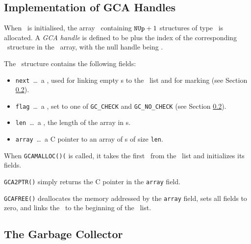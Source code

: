 \subsection{Implementation of GCA Handles}

When \saclib\ is initialised, the array \GCASPACE\ containing ${\tt NUp}+1$
structures of type \GCArray\ is allocated. A {\em GCA handle} is defined to be
\BETAp plus the index of the corresponding \GCArray\ structure in the
\GCASPACE\ array, with the null handle being \NIL.

The \GCArray\ structure contains the following fields:
\begin{itemize}
\item {\tt next}\ \ldots\
  a \Word, used for linking empty \GCArray s to the \GCAAVAIL\ list and for
  marking (see Section \ref{cNIWsGCssGC}).
\item {\tt flag}\ \ldots\
  a \Word, set to one of {\tt GC\_CHECK} and {\tt GC\_NO\_CHECK} (see Section
  \ref{cNIWsGCssGC}).
\item {\tt len}\ \ldots\
  a \Word, the length of the array in \Word s.
\item {\tt array}\ \ldots\
  a C pointer to an array of \Word s of size {\tt len}.
\end{itemize}

When {\tt GCAMALLOC()(} is called, it takes the first \GCArray\ from the
\GCAAVAIL\ list and initializes its fields.

{\tt GCA2PTR()} simply returns the C pointer in the {\tt array} field.

{\tt GCAFREE()} deallocates the memory addressed by the {\tt array} field,
sets all fields to zero, and links the \GCArray\ to the beginning of the 
\GCAAVAIL\ list. 


\subsection{The Garbage Collector}
\label{cNIWsGCssGC}

